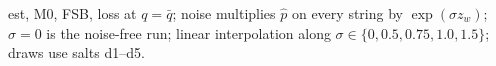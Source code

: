 est, M0, FSB, loss at $q=\bar q$; noise multiplies $\hat p$ on every string by $\exp(\sigma z_w)$; $\sigma=0$ is the noise-free run; linear interpolation along $\sigma\in\{0,0.5,0.75,1.0,1.5\}$; draws use salts d1--d5.
